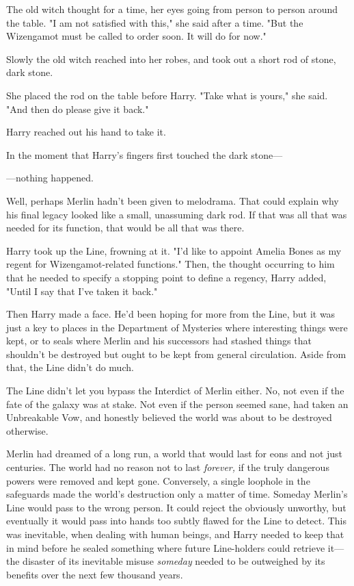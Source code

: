 The old witch thought for a time, her eyes going from person to person around
the table. "I am not satisfied with this," she said after a time. "But the
Wizengamot must be called to order soon. It will do for now."

Slowly the old witch reached into her robes, and took out a short rod of stone,
dark stone.

She placed the rod on the table before Harry. "Take what is yours," she said.
"And then do please give it back."

Harry reached out his hand to take it.

In the moment that Harry's fingers first touched the dark stone---

---nothing happened.

Well, perhaps Merlin hadn't been given to melodrama. That could explain why his
final legacy looked like a small, unassuming dark rod. If that was all that was
needed for its function, that would be all that was there.

Harry took up the Line, frowning at it. "I'd like to appoint Amelia Bones as my
regent for Wizengamot-related functions." Then, the thought occurring to him
that he needed to specify a stopping point to define a regency, Harry added,
"Until I say that I've taken it back."

Then Harry made a face. He'd been hoping for more from the Line, but it was
just a key to places in the Department of Mysteries where interesting things
were kept, or to seals where Merlin and his successors had stashed things that
shouldn't be destroyed but ought to be kept from general circulation. Aside
from that, the Line didn't do much.

The Line didn't let you bypass the Interdict of Merlin either. No, not even if
the fate of the galaxy was at stake. Not even if the person seemed sane, had
taken an Unbreakable Vow, and honestly believed the world was about to be
destroyed otherwise.

Merlin had dreamed of a long run, a world that would last for eons and not just
centuries. The world had no reason not to last \emph{forever,} if the truly
dangerous powers were removed and kept gone. Conversely, a single loophole in
the safeguards made the world's destruction only a matter of time. Someday
Merlin's Line would pass to the wrong person. It could reject the obviously
unworthy, but eventually it would pass into hands too subtly flawed for the
Line to detect. This was inevitable, when dealing with human beings, and Harry
needed to keep that in mind before he sealed something where future
Line-holders could retrieve it---the disaster of its inevitable misuse
\emph{someday} needed to be outweighed by its benefits over the next few
thousand years.

